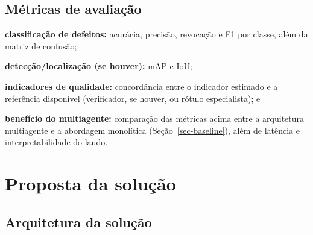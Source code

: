 \documentclass[
	article,			%
	11pt,				%
	oneside,			%
	a4paper,			%
	english,			%
	brazilian,			%
	sumario=tradicional
	]{abntex2}
\begin{document}
\subsection{Métricas de avaliação}

\begin{alineas}
	\item \textbf{classificação de defeitos:} acurácia, precisão, revocação e F1
	por classe, além da matriz de confusão;
	\item \textbf{detecção/localização (se houver):} mAP e IoU;
	\item \textbf{indicadores de qualidade:} concordância entre o indicador
	estimado e a referência disponível (verificador, se houver, ou rótulo
	especialista); e
	\item \textbf{benefício do multiagente:} comparação das métricas acima entre a
	arquitetura multiagente e a abordagem monolítica (Seção~\ref{sec-baseline}),
	além de latência e interpretabilidade do laudo.
\end{alineas}

\section{Proposta da solução}\label{sec-proposta}

\subsection{Arquitetura da solução}
\end{document}
